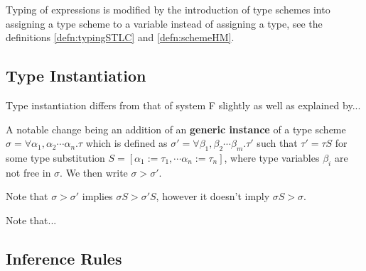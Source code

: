 Typing of expressions is modified by the introduction of type schemes into assigning a type scheme to a variable instead of assigning a type, see the definitions \ref{defn:typingSTLC} and \ref{defn:schemeHM}.

\subsection{Type Instantiation}

Type instantiation differs from that of system F slightly as well as explained  by... %

A notable change being an addition of an \textbf{generic instance} of a type scheme $\sigma = \forall \alpha_1, \alpha_2 \cdots \alpha_n . \tau$ which is defined as $\sigma' = \forall \beta_1, \beta_2 \cdots \beta_m . \tau'$ such that $\tau' = \tau S$ for some type substitution $S = [\alpha_1 := \tau_1, \cdots \alpha_n := \tau_n]$, where type variables $\beta_i$ are not free in $\sigma$. We then write $\sigma > \sigma'$.

Note that $\sigma > \sigma'$ implies $\sigma S > \sigma' S$, however it doesn't imply $\sigma S > \sigma$.

Note that... %

\subsection{Inference Rules}

